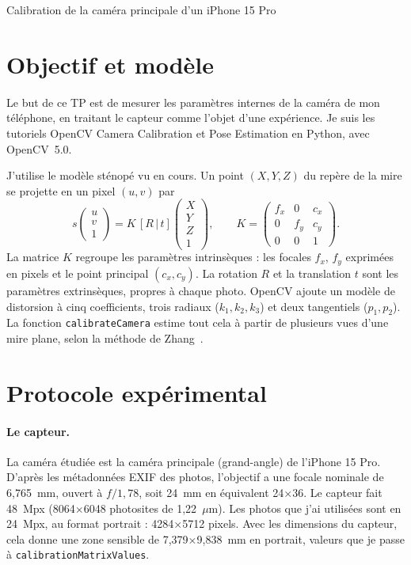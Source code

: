 \documentclass[11pt,a4paper]{article}
\begin{document}
\begin{center}
{\LARGE Calibration de la caméra principale d'un iPhone 15 Pro}
\end{center}
\vspace{1em}

\section{Objectif et modèle}

Le but de ce TP est de mesurer les paramètres internes de la caméra de mon téléphone, en traitant le capteur comme l'objet d'une expérience. Je suis les tutoriels OpenCV \og Camera Calibration\fg{} et \og Pose Estimation\fg{} en Python, avec OpenCV~5.0.

J'utilise le modèle sténopé vu en cours. Un point $(X,Y,Z)$ du repère de la mire se projette en un pixel $(u,v)$ par
\[
s\begin{pmatrix}u\\v\\1\end{pmatrix}
= K\,[R\,|\,t]\begin{pmatrix}X\\Y\\Z\\1\end{pmatrix},
\qquad
K=\begin{pmatrix}f_x & 0 & c_x\\ 0 & f_y & c_y\\ 0&0&1\end{pmatrix}.
\]
La matrice $K$ regroupe les paramètres intrinsèques : les focales $f_x$, $f_y$ exprimées en pixels et le point principal $(c_x,c_y)$. La rotation $R$ et la translation $t$ sont les paramètres extrinsèques, propres à chaque photo. OpenCV ajoute un modèle de distorsion à cinq coefficients, trois radiaux ($k_1,k_2,k_3$) et deux tangentiels ($p_1,p_2$). La fonction \texttt{calibrateCamera} estime tout cela à partir de plusieurs vues d'une mire plane, selon la méthode de Zhang~\cite{zhang}.

\section{Protocole expérimental}

\paragraph{Le capteur.} La caméra étudiée est la caméra principale (\og grand-angle\fg{}) de l'iPhone 15 Pro. D'après les métadonnées EXIF des photos, l'objectif a une focale nominale de 6,765~mm, ouvert à $f/1{,}78$, soit 24~mm en équivalent 24$\times$36. Le capteur fait 48~Mpx (8064$\times$6048 photosites de 1,22~$\mu$m). Les photos que j'ai utilisées sont en 24~Mpx, au format portrait : 4284$\times$5712 pixels. Avec les dimensions du capteur, cela donne une zone sensible de 7,379$\times$9,838~mm en portrait, valeurs que je passe à \texttt{calibrationMatrixValues}.
\end{document}
